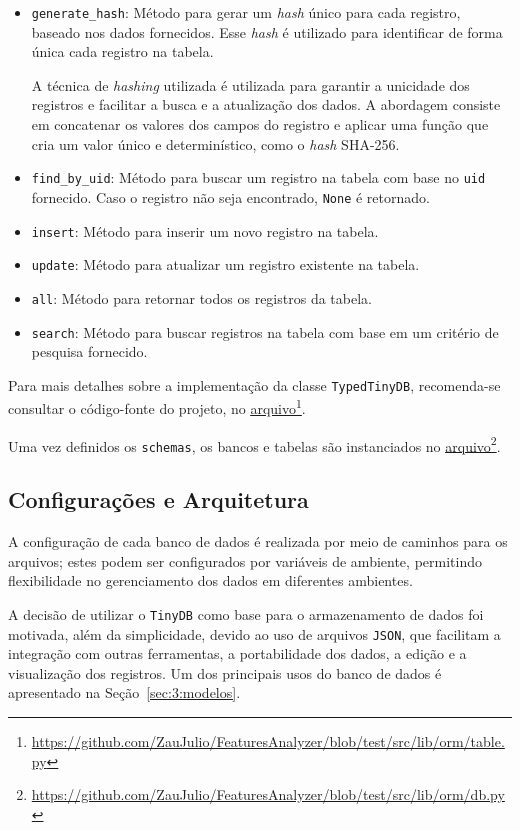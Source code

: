 \begin{itemize}
    \item \texttt{generate\_hash}: Método para gerar um \textit{hash} único para cada registro, baseado nos dados fornecidos. Esse \textit{hash} é utilizado para identificar de forma única cada registro na tabela.

    A técnica de \textit{hashing} utilizada é utilizada para garantir a unicidade dos registros e facilitar a busca e a atualização dos dados. A abordagem consiste em concatenar os valores dos campos do registro e aplicar uma função que cria um valor único e determinístico, como o \textit{hash} SHA-256.

    \item \texttt{find\_by\_uid}: Método para buscar um registro na tabela com base no \texttt{uid} fornecido. Caso o registro não seja encontrado, \texttt{None} é retornado.

    \item \texttt{insert}: Método para inserir um novo registro na tabela.

    \item \texttt{update}: Método para atualizar um registro existente na tabela.

    \item \texttt{all}: Método para retornar todos os registros da tabela.

    \item \texttt{search}: Método para buscar registros na tabela com base em um critério de pesquisa fornecido.
\end{itemize}
\label{list:table_methods}

\newcommand\urlTable{https://github.com/ZauJulio/FeaturesAnalyzer/blob/test/src/lib/orm/table.py}
\newcommand\urlDB{https://github.com/ZauJulio/FeaturesAnalyzer/blob/test/src/lib/orm/db.py}

Para mais detalhes sobre a implementação da classe \texttt{TypedTinyDB}, recomenda-se consultar o código-fonte do projeto, no \href{\urlTable}{\underline{arquivo}}\footnote{\url{\urlTable}}.

Uma vez definidos os \texttt{schemas}, os bancos e tabelas são instanciados no \href{\urlDB}{\underline{arquivo}}\footnote{\url{\urlDB}}.

\subsection{Configurações e Arquitetura}
\label{subsec:3:configuracoes-arquitetura}

A configuração de cada banco de dados é realizada por meio de caminhos para os arquivos; estes podem ser configurados por variáveis de ambiente, permitindo flexibilidade no gerenciamento dos dados em diferentes ambientes.

A decisão de utilizar o \texttt{TinyDB} como base para o armazenamento de dados foi motivada, além da simplicidade, devido ao uso de arquivos \texttt{JSON}, que facilitam a integração com outras ferramentas, a portabilidade dos dados, a edição e a visualização dos registros. Um dos principais usos do banco de dados é apresentado na Seção~\ref{sec:3:modelos}.